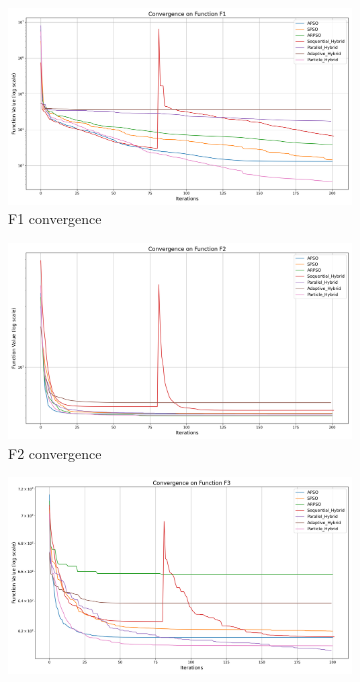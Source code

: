 \documentclass[aspectratio=169]{beamer}
\begin{document}
\begin{frame}
    \centering
    \begin{figure}
        \centering
        \begin{subfigure}[b]{0.19\textwidth}
            \includegraphics[width=\textwidth]{../plots/exploitation/hybrid_convergence_f1.png}
            \caption*{F1 convergence}
        \end{subfigure}
        \hfill
        \begin{subfigure}[b]{0.19\textwidth}
            \includegraphics[width=\textwidth]{../plots/exploitation/hybrid_convergence_f2.png}
            \caption*{F2 convergence}
        \end{subfigure}
        \hfill
        \begin{subfigure}[b]{0.19\textwidth}
            \includegraphics[width=\textwidth]{../plots/exploitation/hybrid_convergence_f3.png}

\end{subfigure}
\end{figure}
\end{frame}
\end{document}
